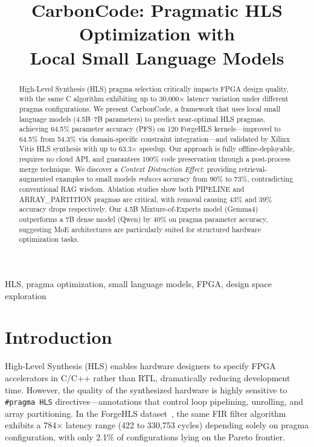 \documentclass[conference]{IEEEtran}
\title{CarbonCode: Pragmatic HLS Optimization with\\Local Small Language Models}
\author{
\IEEEauthorblockN{William Chen}
\IEEEauthorblockA{
National Taiwan University\\
Taipei, Taiwan\\
}
}
\begin{document}
\maketitle

\begin{abstract}
High-Level Synthesis (HLS) pragma selection critically impacts FPGA design quality,
with the same C algorithm exhibiting up to 30,000$\times$ latency variation under
different pragma configurations. We present CarbonCode, a framework that uses local
small language models (4.5B--7B parameters) to predict near-optimal HLS pragmas,
achieving 64.5\% parameter accuracy (PFS) on 120 ForgeHLS kernels---improved
to 64.5\% from 54.3\% via domain-specific constraint integration---and
validated by Xilinx Vitis HLS synthesis with up to 63.3$\times$ speedup. Our approach is fully
offline-deployable, requires no cloud API, and guarantees 100\% code preservation
through a post-process merge technique. We discover a \emph{Context Distraction
Effect}: providing retrieval-augmented examples to small models \emph{reduces}
accuracy from 90\% to 73\%, contradicting conventional RAG wisdom. Ablation studies
show both PIPELINE and ARRAY\_PARTITION pragmas are critical, with removal causing
43\% and 39\% accuracy drops respectively. Our 4.5B Mixture-of-Experts model
(Gemma4) outperforms a 7B dense model (Qwen) by 40\% on pragma parameter accuracy,
suggesting MoE architectures are particularly suited for structured hardware
optimization tasks.
\end{abstract}

\begin{IEEEkeywords}
HLS, pragma optimization, small language models, FPGA, design space exploration
\end{IEEEkeywords}

\section{Introduction}

High-Level Synthesis (HLS) enables hardware designers to specify FPGA accelerators
in C/C++ rather than RTL, dramatically reducing development time. However, the
quality of the synthesized hardware is highly sensitive to \texttt{\#pragma HLS}
directives---annotations that control loop pipelining, unrolling, and array
partitioning. In the ForgeHLS dataset~\cite{forgehls}, the same FIR filter
algorithm exhibits a 784$\times$ latency range (422 to 330,753 cycles) depending
solely on pragma configuration, with only 2.1\% of configurations lying on the
Pareto frontier.
\end{document}
